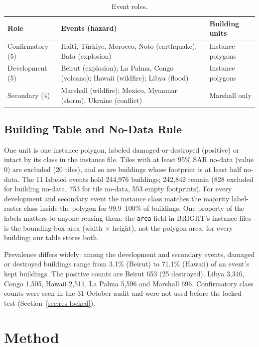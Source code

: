 \documentclass[journal]{IEEEtran}
\begin{document}
\begin{table}[t]
\centering
\caption{Event roles.}
\label{tab:roles}
\footnotesize
\begin{tabular}{@{}L{1.55cm}L{3.9cm}L{1.95cm}@{}}
\toprule
Role & Events (hazard) & Building units \\
\midrule
Confirmatory (5) & Haiti, T\"urkiye, Morocco, Noto (earthquake); Bata (explosion) & Instance polygons \\
Development (5) & Beirut (explosion); La Palma, Congo (volcano); Hawaii (wildfire); Libya (flood) & Instance polygons \\
Secondary (4) & Marshall (wildfire); Mexico, Myanmar (storm); Ukraine (conflict) & Marshall only \\
\bottomrule
\end{tabular}
\end{table}

\subsection{Building Table and No-Data Rule}
One unit is one instance polygon, labeled damaged-or-destroyed (positive) or intact by its class in the instance file. Tiles with at least 95\% SAR no-data (value 0) are excluded (20 tiles), and so are buildings whose footprint is at least half no-data. The 11 labeled events hold 244,976 buildings; 242,842 remain (828 excluded for building no-data, 753 for tile no-data, 553 empty footprints). For every development and secondary event the instance class matches the majority label-raster class inside the polygon for 99.9--100\% of buildings. One property of the labels matters to anyone reusing them: the \texttt{area} field in BRIGHT's instance files is the bounding-box area (width $\times$ height), not the polygon area, for every building; our table stores both.

Prevalence differs widely: among the development and secondary events, damaged or destroyed buildings range from 3.1\% (Beirut) to 71.1\% (Hawaii) of an event's kept buildings. The positive counts are Beirut 653 (25 destroyed), Libya 3,346, Congo 1,505, Hawaii 2,511, La Palma 5,596 and Marshall 696. Confirmatory class counts were seen in the 31 October audit and were not used before the locked test (Section~\ref{sec:res-locked}).

\section{Method}
\label{sec:method}
\end{document}
